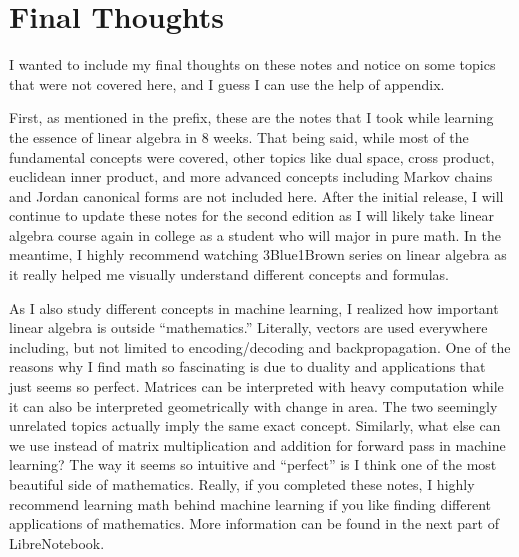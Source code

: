 \documentclass[../../main.tex]{subfiles}
\begin{document}
\section{Final Thoughts}

I wanted to include my final thoughts on these notes and notice on
some topics that were not covered here, and I guess I can use the
help of appendix.

First, as mentioned in the prefix, these are the notes that I took
while learning the essence of linear algebra in 8 weeks. That being
said, while most of the fundamental concepts were covered, other
topics like dual space, cross product, euclidean inner product,
and more advanced concepts including Markov chains and Jordan
canonical forms are not included here. After the initial release,
I will continue to update these notes for the second edition as I will
likely take linear algebra course again in college as a student who
will major in pure math. In the meantime, I highly recommend watching
3Blue1Brown series on linear algebra as it really helped me visually
understand different concepts and formulas.

As I also study different concepts in machine learning, I realized
how important linear algebra is outside ``mathematics.'' Literally,
vectors are used everywhere including, but not limited to
encoding/decoding and backpropagation. One of the reasons why I
find math so fascinating is due to duality and applications that
just seems so perfect. Matrices can be interpreted with heavy
computation while it can also be interpreted geometrically with
change in area. The two seemingly unrelated topics actually imply
the same exact concept. Similarly, what else can we use instead of
matrix multiplication and addition for forward pass in machine
learning? The way it seems so intuitive and ``perfect'' is I think one
of the most beautiful side of mathematics. Really, if you completed
these notes, I highly recommend learning math behind machine learning
if you like finding different applications of mathematics. More
information can be found in the next part of LibreNotebook.
\end{document}
